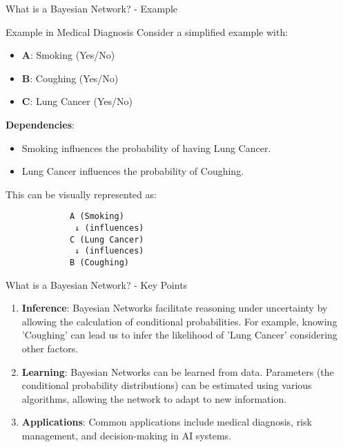 \documentclass[aspectratio=169]{beamer}
\begin{document}
\begin{frame}[fragile]{What is a Bayesian Network? - Example}
    \begin{block}{Example in Medical Diagnosis}
        Consider a simplified example with:
        \begin{itemize}
            \item \textbf{A}: Smoking (Yes/No)
            \item \textbf{B}: Coughing (Yes/No)
            \item \textbf{C}: Lung Cancer (Yes/No)
        \end{itemize}
        
        \textbf{Dependencies}:
        \begin{itemize}
            \item Smoking influences the probability of having Lung Cancer.
            \item Lung Cancer influences the probability of Coughing.
        \end{itemize}

        This can be visually represented as:
        \begin{lstlisting}
             A (Smoking)
              ↓ (influences)
             C (Lung Cancer)
              ↓ (influences)
             B (Coughing)
        \end{lstlisting}
    \end{block}
\end{frame}

\begin{frame}[fragile]{What is a Bayesian Network? - Key Points}
    \begin{enumerate}
        \item \textbf{Inference}: Bayesian Networks facilitate reasoning under uncertainty by allowing the calculation of conditional probabilities. For example, knowing 'Coughing' can lead us to infer the likelihood of 'Lung Cancer' considering other factors.
        \item \textbf{Learning}: Bayesian Networks can be learned from data. Parameters (the conditional probability distributions) can be estimated using various algorithms, allowing the network to adapt to new information.
        \item \textbf{Applications}: Common applications include medical diagnosis, risk management, and decision-making in AI systems.
    \end{enumerate}
\end{frame}
\end{document}
